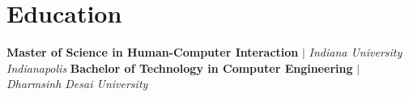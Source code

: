 \section{Education}
    \resumeSubHeadingListStart
  \resumeProjectHeading
    {\textbf{Master of Science in Human-Computer Interaction} $|$ \emph{Indiana University Indianapolis}}{}
  \resumeProjectHeading
    {\textbf{Bachelor of Technology in Computer Engineering} $|$ \emph{Dharmsinh Desai University}}{}
    \resumeSubHeadingListEnd
